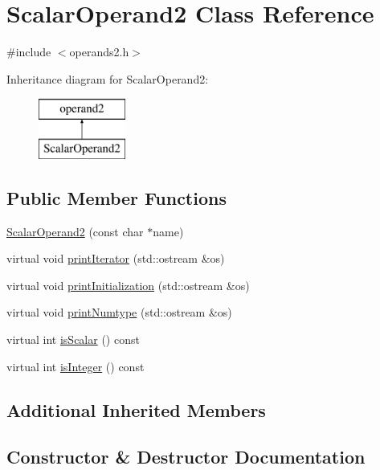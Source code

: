 \hypertarget{classScalarOperand2}{}\section{Scalar\+Operand2 Class Reference}
\label{classScalarOperand2}


{\ttfamily \#include $<$operands2.\+h$>$}

Inheritance diagram for Scalar\+Operand2\+:\begin{figure}[H]
\begin{center}
\leavevmode
\includegraphics[height=2.000000cm]{classScalarOperand2}
\end{center}
\end{figure}
\subsection*{Public Member Functions}
\begin{DoxyCompactItemize}
\item 
\hyperlink{classScalarOperand2_a242db3e2a7e332e9163146720a6d7de6}{Scalar\+Operand2} (const char $\ast$name)
\item 
virtual void \hyperlink{classScalarOperand2_ac57317869f551208dc8921e41458f514}{print\+Iterator} (std\+::ostream \&os)
\item 
virtual void \hyperlink{classScalarOperand2_a73c209305f92e751e24936c082eea977}{print\+Initialization} (std\+::ostream \&os)
\item 
virtual void \hyperlink{classScalarOperand2_a9a2878cf59de4d6798e370d6b7e4d309}{print\+Numtype} (std\+::ostream \&os)
\item 
virtual int \hyperlink{classScalarOperand2_a3c1c7b8e9ea420ea6aa3895c90318774}{is\+Scalar} () const 
\item 
virtual int \hyperlink{classScalarOperand2_a762fff9799775c5abe92fa4ed403efe7}{is\+Integer} () const 
\end{DoxyCompactItemize}
\subsection*{Additional Inherited Members}


\subsection{Constructor \& Destructor Documentation}
\hypertarget{classScalarOperand2_a242db3e2a7e332e9163146720a6d7de6}{}
